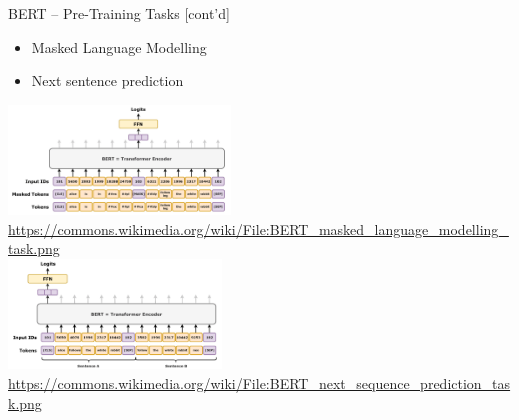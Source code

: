 \documentclass[ignorenonframetext,xcolor=x11names]{beamer}
\begin{document}
\begin{frame}{BERT -- Pre-Training Tasks \small [cont'd]}
\begin{itemize}
   \item Masked Language Modelling
   \item Next sentence prediction
\end{itemize}

\begin{center}
\includegraphics[height=1.15in]{BERT_masked_language_modelling_task.png} \\
\tiny \url{https://commons.wikimedia.org/wiki/File:BERT_masked_language_modelling_task.png} \normalsize \\

\includegraphics[height=1.15in]{BERT_next_sequence_prediction_task.png} \\
\tiny \url{https://commons.wikimedia.org/wiki/File:BERT_next_sequence_prediction_task.png} \normalsize
\end{center}

\end{frame}
\end{document}

